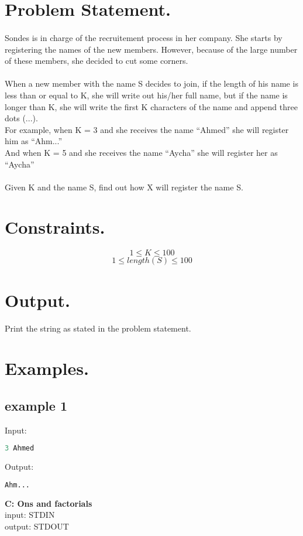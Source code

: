 \documentclass[10pt]{article}
\begin{document}
\section{Problem Statement.}
\paragraph{}
Sondes is in charge of the recruitement process in her company. She starts by registering the names of the new members.
However, because of the large number of these members, she decided to cut some corners.
\paragraph{}
When a new member with the name S decides to join, if the length of his name is less than or equal to K, she will write out his/her full name, but if the name is longer than K, she will write the first K characters of the name and append three dots (...).\\
For example, when K = 3 and she receives the name “Ahmed” she will register him as “Ahm...”\\
And when K = 5 and she receives the name “Aycha” she will register her as “Aycha”\\
\paragraph{}
Given K and the name S, find out how X will register the name S.
\paragraph{}
\section{Constraints.}
$$ 1\le K \le 100 $$
$$ 1\le length(S) \le 100 $$
\section{Output.}
Print the string as stated in the problem statement.
\section{Examples.}
\subsection{example 1}
Input:
\begin{lstlisting}[language=Python]
3 Ahmed
\end{lstlisting}
Output:
\begin{lstlisting}[language=Python]
Ahm...
\end{lstlisting}
\newpage
\begin{center}
    \Huge { \textbf{C: Ons and factorials}}\\
    \normalsize  { input:  STDIN}\\
    \normalsize{    output: STDOUT}
\end{center}
\end{document}
